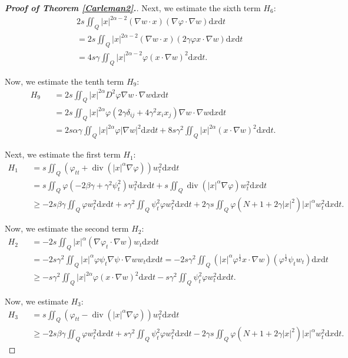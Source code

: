 \documentclass[10pt,a4paper]{amsart}
\DeclareMathOperator{\Div}{div}
\def\al{\alpha}
\def\be{\beta}
\def\bf{\textbf}
\def\de{\delta}
\def\df{\mathrm d}
\def\f{\frac}
\def\ga{\gamma}
\def\vp{\varphi}
\begin{document}
\begin{proof}[{\rm \bf { Proof of  Theorem \ref{Carleman2}.}}]
			Next, we estimate the sixth term $H_6$:
			\begin{eqnarray*}
				&&2s\iint_Q|x|^{2\al-2}(\nabla w\cdot x)(\nabla \vp\cdot \nabla w)\df x\df t\\
				&&=2s\iint_Q |x|^{2\al-2}(\nabla w\cdot x) (2\ga \vp x\cdot \nabla w)\df x\df t\\
				&&=4s\ga\iint_Q|x|^{2\al-2}\vp (x\cdot \nabla w)^2\df x\df t.
			\end{eqnarray*}
			
			Now, we estimate the tenth term $H_{9}$:
			\begin{eqnarray*}
				H_{9}
				&&=2s\iint_Q|x|^{2\al}D^2\vp\nabla w\cdot \nabla w\df x\df t\\
				&&=2s\iint_Q|x|^{2\al} \vp\left(2\ga \de_{ij}+4\ga^2x_ix_j\right) \nabla w\cdot \nabla w\df x\df t\\
				&&=2s \alpha \ga \iint_Q|x|^{2\al}\vp |\nabla w|^2\df x\df t+8s\ga^2\iint_Q|x|^{2\al}(x\cdot \nabla w)^2\df x\df t.
			\end{eqnarray*}
			
			
			Next, we estimate the first term $H_1$:
			\begin{eqnarray*}
				H_1
				&&=s\iint_Q\left(\vp_{tt}+\Div \left(|x|^\al \nabla\vp\right)\right) w_t^2\df x\df t\\
				&&=s\iint_Q\vp(-2\be\ga+\ga^2\psi_t^2)w_t^2\df x\df t+s\iint_Q\Div(|x|^\al \nabla \vp)w_t^2\df x\df t\\
				&&\geq-2s\be\ga\iint_Q\vp w_t^2\df x\df t+s\ga^2\iint_Q \psi_t^2\vp w_t^2\df x\df t+2\ga s\iint_Q\vp\left(N+1+2\ga |x|^2\right)|x|^\al w_t^2\df x\df t.
			\end{eqnarray*}
			
			
			Now, we estimate the second term $H_2$:
			\begin{eqnarray*}
				H_2
				&&=-2s\iint_Q|x|^\al(\nabla\vp_t \cdot \nabla w) w_t\df x\df t\\
				&&=-2s\ga^2\iint_Q |x|^\al \vp  \psi_t\nabla \psi \cdot \nabla w w_t\df x\df t=-2s\ga^2\iint_Q( |x|^\al \vp^\f{1}{2}x\cdot \nabla w)(\vp^\f{1}{2}\psi_tw_t)\df x\df t \\
				&&\geq -s\ga^2\iint_Q|x|^{2\al}\vp(x\cdot \nabla w)^2\df x\df t-s\ga^2 \iint_Q\psi_t^2 \vp w_t^2\df x\df t.
			\end{eqnarray*}
			
			
			Now, we estimate $H_3$:
			\begin{eqnarray*}
				H_3
				&& =s\iint_Q\left(\vp_{tt}-\Div (|x|^\al \nabla \vp)\right)w_t^2\df x\df t\\
				&&\geq -2s\be\ga \iint_Q\vp w_t^2\df x\df t+s\ga^2\iint_Q \psi_t^2\vp w_t^2\df x\df t-2\ga s\iint_Q\vp\left(N+1+2\ga |x|^2\right)|x|^\al w_t^2\df x\df t.
			\end{eqnarray*}
			

\end{proof}
\end{document}
